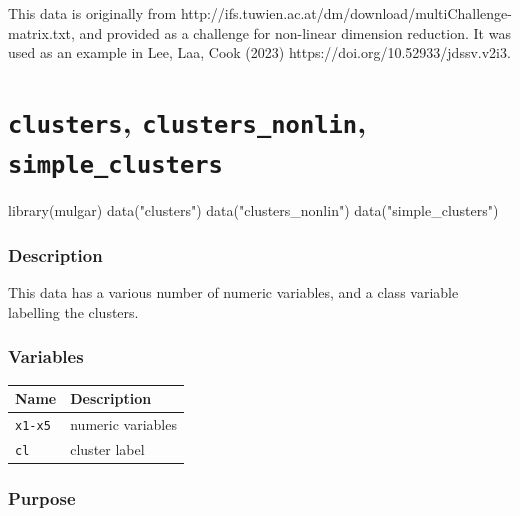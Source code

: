 \documentclass[
  letterpaper,
]{krantz}
\newenvironment{Shaded}{\begin{snugshade}}{\end{snugshade}}
\newcommand{\FunctionTok}[1]{\textcolor[rgb]{0.28,0.35,0.67}{#1}}
\newcommand{\NormalTok}[1]{\textcolor[rgb]{0.00,0.23,0.31}{#1}}
\newcommand{\StringTok}[1]{\textcolor[rgb]{0.13,0.47,0.30}{#1}}
\newcounter{none} %
\begin{document}
This data is originally from
http://ifs.tuwien.ac.at/dm/download/multiChallenge-matrix.txt, and
provided as a challenge for non-linear dimension reduction. It was used
as an example in Lee, Laa, Cook (2023)
https://doi.org/10.52933/jdssv.v2i3.

\section{\texorpdfstring{\texttt{clusters}, \texttt{clusters\_nonlin},
\texttt{simple\_clusters}}{clusters, clusters\_nonlin, simple\_clusters}}\label{clusters-clusters_nonlin-simple_clusters}

\begin{Shaded}
\begin{Highlighting}[]
\FunctionTok{library}\NormalTok{(mulgar)}
\FunctionTok{data}\NormalTok{(}\StringTok{"clusters"}\NormalTok{)}
\FunctionTok{data}\NormalTok{(}\StringTok{"clusters\_nonlin"}\NormalTok{)}
\FunctionTok{data}\NormalTok{(}\StringTok{"simple\_clusters"}\NormalTok{)}
\end{Highlighting}
\end{Shaded}

\subsubsection*{Description}\label{description-8}

This data has a various number of numeric variables, and a class
variable labelling the clusters.

\subsubsection*{Variables}\label{variables-8}

{\def\LTcaptype{none} %
\begin{longtable}[]{@{}ll@{}}
\toprule\noalign{}
Name & Description \\
\midrule\noalign{}
\endhead
\bottomrule\noalign{}
\endlastfoot
\texttt{x1-x5} & numeric variables \\
\texttt{cl} & cluster label \\
\end{longtable}
}

\subsubsection*{Purpose}\label{purpose-8}
\end{document}

